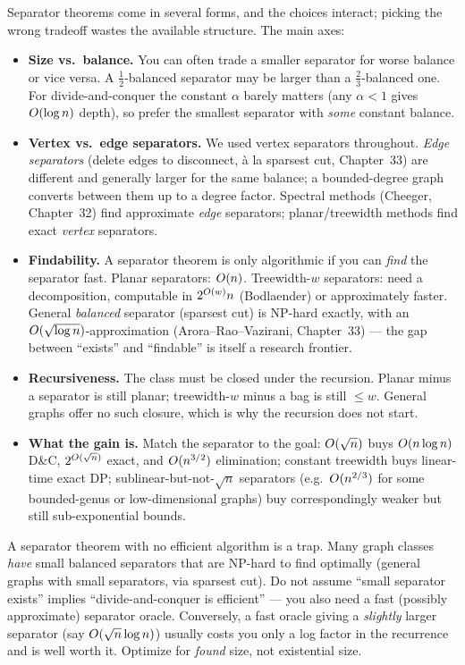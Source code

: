 Separator theorems come in several forms, and the choices interact; picking the wrong tradeoff wastes the available structure. The main axes:

\begin{itemize}
  \item \textbf{Size vs.\ balance.} You can often trade a smaller separator for worse balance or vice versa. A $\tfrac12$-balanced separator may be larger than a $\tfrac23$-balanced one. For divide-and-conquer the constant $\alpha$ barely matters (any $\alpha<1$ gives $O(\log n)$ depth), so prefer the smallest separator with \emph{some} constant balance.
  \item \textbf{Vertex vs.\ edge separators.} We used vertex separators throughout. \emph{Edge separators} (delete edges to disconnect, à la sparsest cut, Chapter~33) are different and generally larger for the same balance; a bounded-degree graph converts between them up to a degree factor. Spectral methods (Cheeger, Chapter~32) find approximate \emph{edge} separators; planar/treewidth methods find exact \emph{vertex} separators.
  \item \textbf{Findability.} A separator theorem is only algorithmic if you can \emph{find} the separator fast. Planar separators: $O(n)$. Treewidth-$w$ separators: need a decomposition, computable in $2^{O(w)} n$ (Bodlaender) or approximately faster. General \emph{balanced} separator (sparsest cut) is NP-hard exactly, with an $O(\sqrt{\log n})$-approximation (Arora--Rao--Vazirani, Chapter~33) --- the gap between ``exists'' and ``findable'' is itself a research frontier.
  \item \textbf{Recursiveness.} The class must be closed under the recursion. Planar minus a separator is still planar; treewidth-$w$ minus a bag is still $\le w$. General graphs offer no such closure, which is why the recursion does not start.
  \item \textbf{What the gain is.} Match the separator to the goal: $O(\sqrt n)$ buys $O(n\log n)$ D\&C, $2^{O(\sqrt n)}$ exact, and $O(n^{3/2})$ elimination; constant treewidth buys linear-time exact DP; sublinear-but-not-$\sqrt n$ separators (e.g.\ $O(n^{2/3})$ for some bounded-genus or low-dimensional graphs) buy correspondingly weaker but still sub-exponential bounds.
\end{itemize}

\begin{trapbox}
A separator theorem with no efficient algorithm is a trap. Many graph classes \emph{have} small balanced separators that are NP-hard to find optimally (general graphs with small separators, via sparsest cut). Do not assume ``small separator exists'' implies ``divide-and-conquer is efficient'' --- you also need a fast (possibly approximate) separator oracle. Conversely, a fast oracle giving a \emph{slightly} larger separator (say $O(\sqrt n\log n)$) usually costs you only a log factor in the recurrence and is well worth it. Optimize for \emph{found} size, not existential size.
\end{trapbox}

